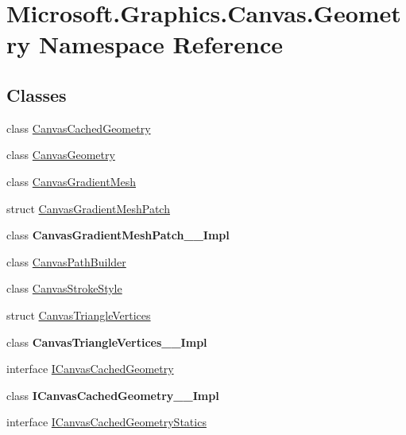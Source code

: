 \hypertarget{namespace_microsoft_1_1_graphics_1_1_canvas_1_1_geometry}{}\section{Microsoft.\+Graphics.\+Canvas.\+Geometry Namespace Reference}
\label{namespace_microsoft_1_1_graphics_1_1_canvas_1_1_geometry}
\subsection*{Classes}
\begin{DoxyCompactItemize}
\item 
class \hyperlink{class_microsoft_1_1_graphics_1_1_canvas_1_1_geometry_1_1_canvas_cached_geometry}{Canvas\+Cached\+Geometry}
\item 
class \hyperlink{class_microsoft_1_1_graphics_1_1_canvas_1_1_geometry_1_1_canvas_geometry}{Canvas\+Geometry}
\item 
class \hyperlink{class_microsoft_1_1_graphics_1_1_canvas_1_1_geometry_1_1_canvas_gradient_mesh}{Canvas\+Gradient\+Mesh}
\item 
struct \hyperlink{struct_microsoft_1_1_graphics_1_1_canvas_1_1_geometry_1_1_canvas_gradient_mesh_patch}{Canvas\+Gradient\+Mesh\+Patch}
\item 
class {\bfseries Canvas\+Gradient\+Mesh\+Patch\+\_\+\+\_\+\+Impl}
\item 
class \hyperlink{class_microsoft_1_1_graphics_1_1_canvas_1_1_geometry_1_1_canvas_path_builder}{Canvas\+Path\+Builder}
\item 
class \hyperlink{class_microsoft_1_1_graphics_1_1_canvas_1_1_geometry_1_1_canvas_stroke_style}{Canvas\+Stroke\+Style}
\item 
struct \hyperlink{struct_microsoft_1_1_graphics_1_1_canvas_1_1_geometry_1_1_canvas_triangle_vertices}{Canvas\+Triangle\+Vertices}
\item 
class {\bfseries Canvas\+Triangle\+Vertices\+\_\+\+\_\+\+Impl}
\item 
interface \hyperlink{interface_microsoft_1_1_graphics_1_1_canvas_1_1_geometry_1_1_i_canvas_cached_geometry}{I\+Canvas\+Cached\+Geometry}
\item 
class {\bfseries I\+Canvas\+Cached\+Geometry\+\_\+\+\_\+\+Impl}
\item 
interface \hyperlink{interface_microsoft_1_1_graphics_1_1_canvas_1_1_geometry_1_1_i_canvas_cached_geometry_statics}{I\+Canvas\+Cached\+Geometry\+Statics}

\end{DoxyCompactItemize}
